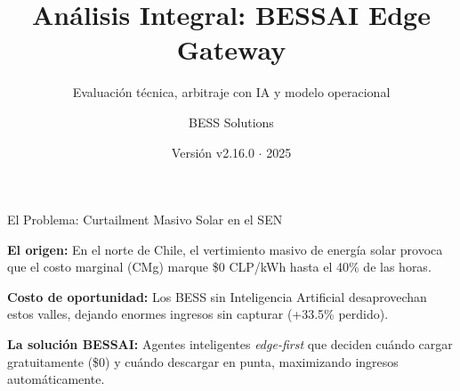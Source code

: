 \documentclass[10pt,aspectratio=169]{beamer}
\title{An\'alisis Integral: BESSAI Edge Gateway}
\subtitle{Evaluaci\'on t\'ecnica, arbitraje con IA y modelo operacional}
\author{BESS Solutions}
\date{Versi\'on v2.16.0 $\cdot$ 2025}
\let\tempone\itemize
\let\temptwo\enditemize
\renewenvironment{itemize}{\tempone\addtolength{\itemsep}{0.3em}}{\temptwo}
\begin{document}
\begin{frame}
  \titlepage
\end{frame}

\begin{frame}{El Problema: Curtailment Masivo Solar en el SEN}
  \begin{itemize}
    \item \textbf{El origen:} En el norte de Chile, el vertimiento masivo de energ\'ia solar provoca que el costo marginal (CMg) marque \$0 CLP/kWh hasta el 40\% de las horas.
    \item \textbf{Costo de oportunidad:} Los BESS sin Inteligencia Artificial desaprovechan estos valles, dejando enormes ingresos sin capturar (+33.5\% perdido).
    \item \textbf{La soluci\'on BESSAI:} Agentes inteligentes \textit{edge-first} que deciden cu\'ando cargar gratuitamente (\$0) y cu\'ando descargar en punta, maximizando ingresos autom\'aticamente.
  \end{itemize}
\end{frame}
\end{document}
